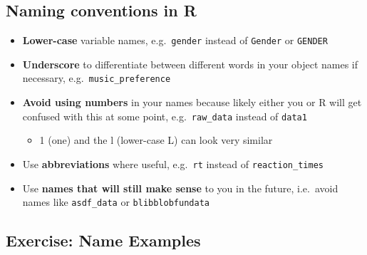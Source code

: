 \documentclass[
]{book}
\providecommand{\tightlist}{%
  \setlength{\itemsep}{0pt}\setlength{\parskip}{0pt}}
\begin{document}
\subsection{Naming conventions in R}\label{naming-conventions-in-r}

\begin{itemize}
\tightlist
\item
  \textbf{Lower-case} variable names, e.g.~\texttt{gender} instead of \texttt{Gender} or \texttt{GENDER}
\item
  \textbf{Underscore} to differentiate between different words in your object names if necessary, e.g.~\texttt{music\_preference}
\item
  \textbf{Avoid using numbers} in your names because likely either you or R will get confused with this at some point, e.g.~\texttt{raw\_data} instead of \texttt{data1}

  \begin{itemize}
  \tightlist
  \item
    1 (one) and the l (lower-case L) can look very similar
  \end{itemize}
\item
  Use \textbf{abbreviations} where useful, e.g.~\texttt{rt} instead of \texttt{reaction\_times}
\item
  Use \textbf{names that will still make sense} to you in the future, i.e.~avoid names like \texttt{asdf\_data} or \texttt{blibblobfundata}
\end{itemize}

\subsection{Exercise: Name Examples}\label{exercise-name-examples}
\end{document}
